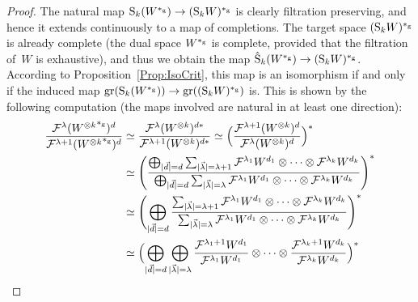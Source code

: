 \documentclass[\MainFolder/Text.tex]{subfiles}
\begin{document}
\begin{proof}
The natural map $\mathrm{S}_k(W^{*_{\mathrm{g}}}) \rightarrow (\mathrm{S}_k W)^{*_{\mathrm{g}}}$ is clearly filtration preserving, and hence it extends continuously to a map of completions. The target space $(\mathrm{S}_k W)^{*_{\mathrm{g}}}$ is already complete (the dual space $W^{*_{\mathrm{g}}}$ is complete, provided that the filtration of~$W$ is exhaustive), and thus we obtain the map $\hat{\mathrm{S}}_k(W^{*_{\mathrm{g}}}) \rightarrow (\mathrm{S}_k W)^{*_{\mathrm{g}}}$. According to Proposition~\ref{Prop:IsoCrit}, this map is an isomorphism if and only if the induced map $\operatorname{\mathrm{gr}}(\mathrm{S}_k(W^{*_{\mathrm{g}}})) \rightarrow \operatorname{\mathrm{gr}}((\mathrm{S}_k W)^{*_{\mathrm{g}}})$ is. This is shown by the following computation (the maps involved are natural in at least one direction):
\allowdisplaybreaks
\begin{align*} 
\frac{\Filtr^\lambda ({W^{\otimes k}}^{\GD})^d}{\Filtr^{\lambda+1} ({W^{\otimes k}}^{\GD})^d} &\simeq \frac{\Filtr^\lambda (W^{\otimes k})^{d*}}{\Filtr^{\lambda+1} (W^{\otimes k})^{d*}} \simeq  \Bigl(\frac{\Filtr^{\lambda+1}(W^{\otimes k})^d}{\Filtr^{\lambda}(W^{\otimes k})^d}\Bigr)^* \\ 
 &\simeq \Biggl( \frac{\bigoplus_{\Abs{\vec{d}}= d} \sum_{\Abs{\vec{\lambda}}= \lambda + 1} \Filtr^{\lambda_1} W^{d_1} \otimes \dotsb \otimes \Filtr^{\lambda_k} W^{d_k}}{\bigoplus_{\Abs{\vec{d}} = d}\sum_{\Abs{\vec{\lambda}} = \lambda} \Filtr^{\lambda_1} W^{d_1} \otimes \dotsb \otimes \Filtr^{\lambda_k} W^{d_k}}\Biggr)^* \\
&\simeq \Biggl( \bigoplus_{\Abs{\vec{d}}= d} \frac{\sum_{\Abs{\vec{\lambda}} = \lambda + 1} \Filtr^{\lambda_1} W^{d_1} \otimes \dotsb \otimes \Filtr^{\lambda_k} W^{d_k}}{\sum_{\Abs{\vec{\lambda}} = \lambda} \Filtr^{\lambda_1} W^{d_1} \otimes \dotsb \otimes \Filtr^{\lambda_k} W^{d_k}}\Biggr)^* \\
&\simeq\Bigl( \bigoplus_{\Abs{\vec{d}} = d} \bigoplus_{\Abs{\vec{\lambda}}=\lambda} \frac{\Filtr^{\lambda_1 + 1}W^{d_1}}{\Filtr^{\lambda_1} W^{d_1}} \otimes \dotsb \otimes \frac{\Filtr^{\lambda_k+1}W^{d_k}}{\Filtr^{\lambda_k} W^{d_k}}\Bigr)^*\\

\end{align*}
\end{proof}
\end{document}
